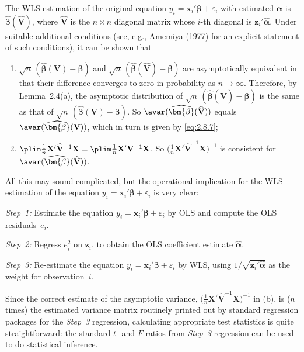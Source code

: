 The WLS estimation of the original equation $y_i = \mathbf{x}_i' \bm{\beta} +
\varepsilon_i$ with estimated $\bm{\alpha}$ is
$\widehat{\bm{\beta}}(\widehat{\mathbf{V}})$, where $\widehat{\mathbf{V}}$ is the
$n \times n$ diagonal matrix whose $i$-th diagonal is
$\mathbf{z}_i' \hat{\bm{\alpha}}$.  Under suitable additional conditions (see, e.g.,
Amemiya (1977) for an explicit statement of such conditions), it can be shown that
\begin{enumerate}[label=(\alph*)]
  \item $\sqrt{n}\,(\widehat{\bm{\beta}}(\mathbf{V}) - \bm{\beta})$ and
    $\sqrt{n}\,(\widehat{\bm{\beta}}(\widehat{\mathbf{V}}) - \bm{\beta})$ are
    asymptotically equivalent in that their difference converges to zero in probability as
    $n \to \infty$.  Therefore, by Lemma~2.4(a), the asymptotic distribution of
    $\sqrt{n}\,(\widehat{\bm{\beta}}(\widehat{\mathbf{V}}) - \bm{\beta})$ is the same as
    that of $\sqrt{n}\,(\widehat{\bm{\beta}}(\mathbf{V}) - \bm{\beta})$.
    So $\avar(\widehat{\bm{\beta}}(\widehat{\mathbf{V}}))$ equals
    $\avar(\widehat{\bm{\beta}}(\mathbf{V}))$, which in turn is given by
    \eqref{eq:2.8.7};

  \item $\plim \frac{1}{n} \mathbf{X}' \widehat{\mathbf{V}}^{-1} \mathbf{X}
    = \plim \frac{1}{n} \mathbf{X}' \mathbf{V}^{-1} \mathbf{X}$.
    So $\bigl(\frac{1}{n} \mathbf{X}' \widehat{\mathbf{V}}^{-1}
    \mathbf{X}\bigr)^{-1}$ is consistent for
    $\avar(\widehat{\bm{\beta}}(\widehat{\mathbf{V}}))$.
\end{enumerate}

All this may sound complicated, but the operational implication for the WLS estimation of
the equation $y_i = \mathbf{x}_i' \bm{\beta} + \varepsilon_i$ is very clear:

\medskip
\noindent
\textit{Step~1:} \; Estimate the equation $y_i = \mathbf{x}_i' \bm{\beta} +
\varepsilon_i$ by OLS and compute the OLS residuals~$e_i$.

\noindent
\textit{Step~2:} \; Regress $e_i^2$ on $\mathbf{z}_i$, to obtain the OLS coefficient
estimate $\hat{\bm{\alpha}}$.

\noindent
\textit{Step~3:} \; Re-estimate the equation $y_i = \mathbf{x}_i' \bm{\beta} +
\varepsilon_i$ by WLS, using $1/\sqrt{\mathbf{z}_i' \hat{\bm{\alpha}}}$ as the weight
for observation~$i$.

\medskip
\noindent
Since the correct estimate of the asymptotic variance,
$\bigl(\frac{1}{n} \mathbf{X}' \widehat{\mathbf{V}}^{-1} \mathbf{X}\bigr)^{-1}$ in (b),
is ($n$ times) the estimated variance matrix routinely printed out by standard regression
packages for the \textit{Step~3} regression, calculating appropriate test statistics is
quite straightforward: the standard $t$- and $F$-ratios from \textit{Step~3} regression
can be used to do statistical inference.

